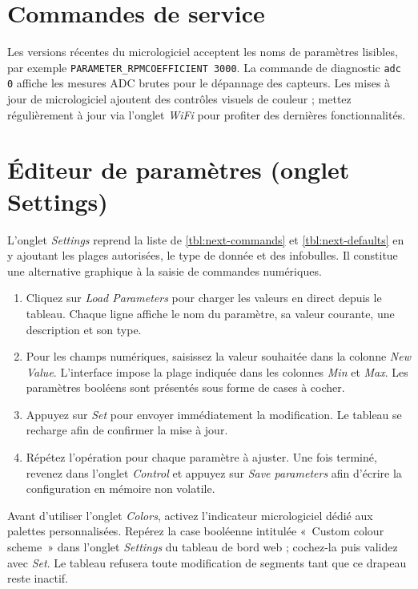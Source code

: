 \section{Commandes de service}
Les versions récentes du micrologiciel acceptent les noms de paramètres lisibles, par exemple \verb|PARAMETER_RPMCOEFFICIENT 3000|.
La commande de diagnostic \verb|adc 0| affiche les mesures ADC brutes pour le dépannage des capteurs.
Les mises à jour de micrologiciel ajoutent des contrôles visuels de couleur ; mettez régulièrement à jour via l'onglet \emph{WiFi} pour profiter des dernières fonctionnalités.

\section{Éditeur de paramètres (onglet Settings)}
L'onglet \emph{Settings} reprend la liste de \autoref{tbl:next-commands} et \autoref{tbl:next-defaults} en y ajoutant les plages autorisées, le type de donnée et des infobulles.
Il constitue une alternative graphique à la saisie de commandes numériques.

\begin{enumerate}
    \item Cliquez sur \emph{Load Parameters} pour charger les valeurs en direct depuis le tableau. Chaque ligne affiche le nom du paramètre, sa valeur courante, une description et son type.
    \item Pour les champs numériques, saisissez la valeur souhaitée dans la colonne \emph{New Value}. L'interface impose la plage indiquée dans les colonnes \emph{Min} et \emph{Max}. Les paramètres booléens sont présentés sous forme de cases à cocher.
    \item Appuyez sur \emph{Set} pour envoyer immédiatement la modification. Le tableau se recharge afin de confirmer la mise à jour.
    \item Répétez l'opération pour chaque paramètre à ajuster. Une fois terminé, revenez dans l'onglet \emph{Control} et appuyez sur \emph{Save parameters} afin d'écrire la configuration en mémoire non volatile.
\end{enumerate}

Avant d'utiliser l'onglet \emph{Colors}, activez l'indicateur micrologiciel dédié aux palettes personnalisées.
Repérez la case booléenne intitulée «~Custom colour scheme~» dans l'onglet \emph{Settings} du tableau de bord web ; cochez-la puis validez avec \emph{Set}. Le tableau refusera toute modification de segments tant que ce drapeau reste inactif.

